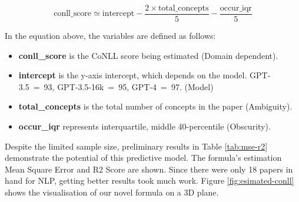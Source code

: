   \begin{equation}
      \text{conll\_score} \simeq \text{intercept} - \frac{2 \times \text{total\_concepts}}{5} - \frac{\text{occur\_iqr}}{5}
  \end{equation}\label{eq:1}
  \label{fig:conll-estimation}

In the equation above, the variables are defined as follows:
\begin{itemize}
  \item \textbf{conll\_score} is the CoNLL score being estimated (Domain dependent).
  \item \textbf{intercept} is the y-axis intercept, which depends on the model. GPT-3.5~=~93, GPT-3.5-16k~=~95, GPT-4~=~97. (Model)
  \item \textbf{total\_concepts} is the total number of concepts in the paper (Ambiguity).
  \item \textbf{occur\_iqr} represents interquartile, middle 40-percentile (Obscurity).
\end{itemize}

Despite the limited sample size, preliminary results in Table \ref{tab:mse-r2} demonstrate the potential of this predictive model. The formula's estimation Mean Square Error and R2 Score are shown. Since there were only 18 papers in hand for NLP, getting better results took much work. %
Figure \ref{fig:esimated-conll} shows the visualisation of our novel formula on a 3D plane.


